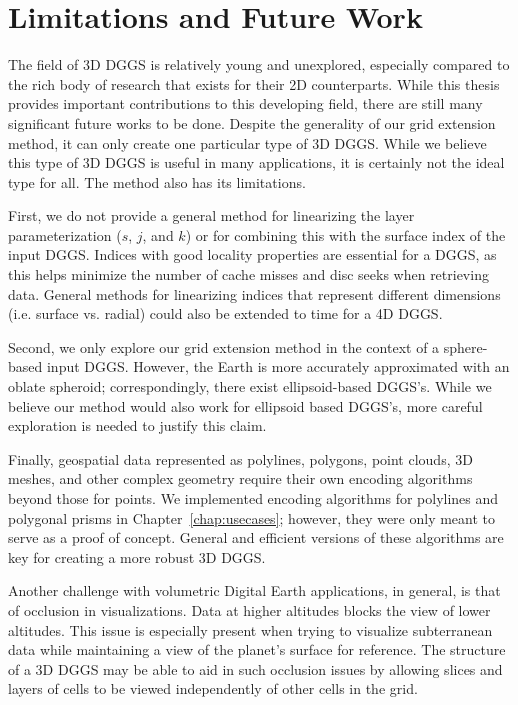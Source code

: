 \section{Limitations and Future Work}
The field of 3D DGGS is relatively young and unexplored, especially compared to the rich body of research that exists for their 2D counterparts.
While this thesis provides important contributions to this developing field, there are still many significant future works to be done.
Despite the generality of our grid extension method, it can only create one particular type of 3D DGGS.
While we believe this type of 3D DGGS is useful in many applications, it is certainly not the ideal type for all.
The method also has its limitations.


First, we do not provide a general method for linearizing the layer parameterization ($s$, $j$, and $k$) or for combining this with the surface index of the input DGGS.
Indices with good locality properties are essential for a DGGS, as this helps minimize the number of cache misses and disc seeks when retrieving data.
General methods for linearizing indices that represent different dimensions (i.e. surface vs. radial) could also be extended to time for a 4D DGGS.


Second, we only explore our grid extension method in the context of a sphere-based input DGGS.
However, the Earth is more accurately approximated with an oblate spheroid; correspondingly, there exist ellipsoid-based DGGS's.
While we believe our method would also work for ellipsoid based DGGS's, more careful exploration is needed to justify this claim.


Finally, geospatial data represented as polylines, polygons, point clouds, 3D meshes, and other complex geometry require their own encoding algorithms beyond those for points.
We implemented encoding algorithms for polylines and polygonal prisms in Chapter~\ref{chap:usecases}; however, they were only meant to serve as a proof of concept.
General and efficient versions of these algorithms are key for creating a more robust 3D DGGS.


Another challenge with volumetric Digital Earth applications, in general, is that of occlusion in visualizations.
Data at higher altitudes blocks the view of lower altitudes.
This issue is especially present when trying to visualize subterranean data while maintaining a view of the planet's surface for reference.
The structure of a 3D DGGS may be able to aid in such occlusion issues by allowing slices and layers of cells to be viewed independently of other cells in the grid.
